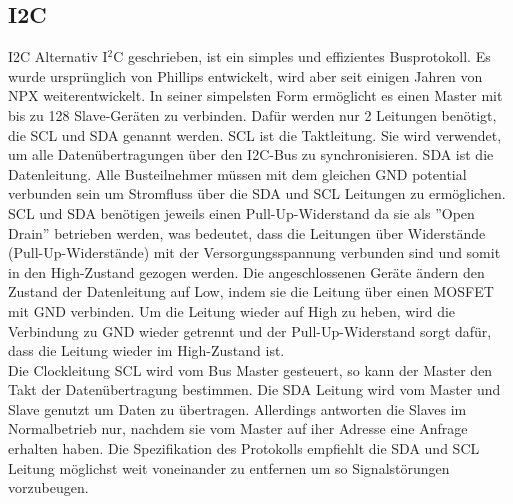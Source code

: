 \subsection{I2C}
I2C Alternativ I$^2$C geschrieben, ist ein simples und effizientes Busprotokoll.
Es wurde ursprünglich von Phillips entwickelt, wird aber seit einigen Jahren von NPX weiterentwickelt.
In seiner simpelsten Form ermöglicht es einen Master mit bis zu 128 Slave-Geräten zu verbinden.
Dafür werden nur 2 Leitungen benötigt, die SCL und SDA genannt werden. SCL ist die Taktleitung. Sie wird verwendet, um alle Datenübertragungen über den I2C-Bus zu synchronisieren. SDA ist die Datenleitung.
Alle Busteilnehmer müssen mit dem gleichen GND potential verbunden sein um Stromfluss über die SDA und SCL Leitungen zu ermöglichen\cite{i2b-bus_org}.\\
SCL und SDA benötigen jeweils einen Pull-Up-Widerstand da sie als ”Open Drain” betrieben werden, was bedeutet, dass die Leitungen über Widerstände (Pull-Up-Widerstände) mit der Versorgungsspannung verbunden sind und somit in den High-Zustand gezogen werden.
Die angeschlossenen Geräte ändern den Zustand der Datenleitung auf Low, indem sie die Leitung über einen MOSFET mit GND verbinden.
Um die Leitung wieder auf High zu heben, wird die Verbindung zu GND wieder getrennt und der Pull-Up-Widerstand sorgt dafür, dass die Leitung wieder im High-Zustand ist.\\
Die Clockleitung SCL wird vom Bus Master gesteuert, so kann der Master den Takt der Datenübertragung bestimmen.
Die SDA Leitung wird vom Master und Slave genutzt um Daten zu übertragen. Allerdings antworten die Slaves im Normalbetrieb nur, nachdem sie vom Master auf iher Adresse eine Anfrage erhalten haben. 
Die Spezifikation des Protokolls\cite{nxp_com} empfiehlt die SDA und SCL Leitung möglichst weit voneinander zu entfernen um so Signalstörungen vorzubeugen.


